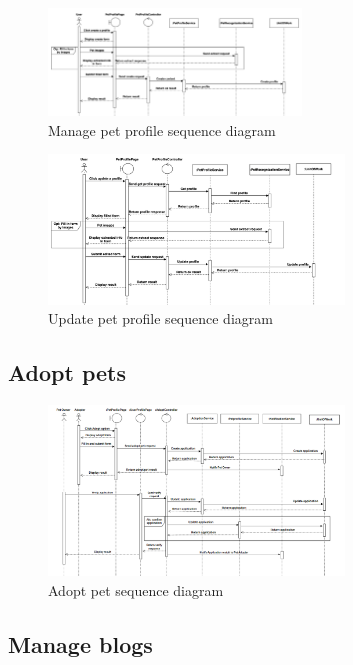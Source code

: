 \begin{figure}[H]
    \centering
    \includegraphics[angle=-90,width=0.6\textwidth]{Figures/manage_pet_seq.png}
    \caption{Manage pet profile sequence diagram}
    \label{fig:manage-pet-seq}
\end{figure}
\clearpage

\begin{figure}[H]
    \centering
    \includegraphics[angle=-90,width=0.7\textwidth]{Figures/update_pet_profile_seq.png}
    \caption{Update pet profile sequence diagram}
    \label{fig:update-pet-seq}
\end{figure}
\clearpage

\subsection*{Adopt pets}
\begin{figure}[H]
    \centering
    \includegraphics[angle=-90,width=0.7\textwidth]{Figures/adopt_pet_seq.png}
    \caption{Adopt pet sequence diagram}
    \label{fig:adopt-pet-seq}
\end{figure}
\clearpage

\subsection{Manage blogs}

